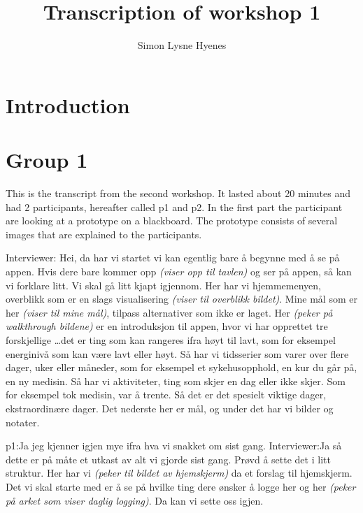 \documentclass[11pt, norsk, a4paper]{article}
\author{Simon Lysne Hyenes}
\title{Transcription of workshop 1}
\begin{document}
\maketitle{}

\section{Introduction}

\section{Group 1}
This is the transcript from the second workshop. It lasted about 20 minutes and had 2 participants, hereafter called p1 and p2. In the first part the participant are looking at a prototype on a blackboard. The prototype consists of several images that are explained to the participants. 

\textcolor{myBlue} {Interviewer:} Hei, da har vi startet vi kan egentlig bare å begynne med å se på appen. Hvis dere bare kommer opp \textcolor{myGrey}{\textit{(viser opp til tavlen)}} og ser på appen, så kan vi forklare litt. Vi skal gå litt kjapt igjennom. Her har vi hjemmemenyen, overblikk som er en slags visualisering \textcolor{myGrey}{\textit{(viser til overblikk bildet)}}. Mine mål som er her \textcolor{myGrey}{\textit{(viser til mine mål)}}, tilpass alternativer som ikke er laget. Her \textcolor{myGrey}{\textit{(peker på walkthrough bildene)}} er en introduksjon til appen, hvor vi har opprettet tre forskjellige \dots det er ting som kan rangeres ifra høyt til lavt, som for eksempel energinivå som kan være lavt eller høyt. Så har vi tidsserier som varer over flere dager, uker eller måneder, som for eksempel et sykehusopphold, en kur du går på, en ny medisin. Så har vi aktiviteter, ting som skjer en dag eller ikke skjer. Som for eksempel tok medisin, var å trente. Så det er det spesielt viktige dager, ekstraordinære dager. Det nederste her er mål, og under det har vi bilder og notater.

\textcolor{myGreen} {p1:}Ja jeg kjenner igjen mye ifra hva vi snakket om sist gang. 
\textcolor{myBlue} {Interviewer:}Ja så dette er på måte et utkast av alt vi gjorde sist gang. Prøvd å sette det i litt struktur. Her har vi \textcolor{myGrey}{\textit{(peker til bildet av hjemskjerm)}} da et forslag til hjemskjerm. 
Det vi skal starte med er å se på hvilke ting dere ønsker å logge her og her \textcolor{myGrey}{\textit{(peker på arket som viser daglig logging)}}. Da kan vi sette oss igjen.
\end{document}
